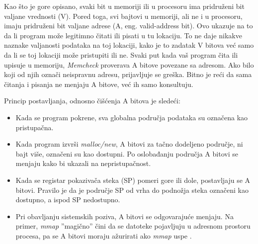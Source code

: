 \documentclass[12pt,oneside]{memoir}
\theoremstyle{plain}
\theoremstyle{definition}
\begin{document}
Kao što je gore opisano, svaki bit u memoriji ili u procesoru ima pridruženi bit valjane vrednosti (V). Pored toga, svi bajtovi u memoriji, ali ne i u procesoru, imaju pridruženi bit valjane adrese (A, eng. valid-address bit). Ovo ukazuje na to da li program može legitimno čitati ili pisati u tu lokaciju. To ne daje nikakve naznake valjanosti podataka na toj lokaciji, kako je to zadatak V bitova već samo da li se toj lokaciji može pristupiti ili ne. Svaki put kada vaš program čita ili upisuje u memoriju, \textit{Memcheck} proverava A bitove povezane sa adresom. Ako bilo koji od njih označi neispravnu adresu, prijavljuje se greška. Bitno je reći da sama čitanja i pisanja ne menjaju A bitove, već ih samo konsultuju.

Princip postavljanja, odnosno čišćenja A bitova je sledeći:
\begin{itemize}
\item Kada se program pokrene, sva globalna područja podataka su označena kao pristupačna.
\item Kada program izvrši \textit{malloc/new}, A bitovi za tačno dodeljeno područje, ni bajt više, označeni su kao dostupni. Po oslobađanju područja A bitovi se menjaju kako bi ukazali na nepristupačnost.
\item Kada se registar pokazivača steka (SP) pomeri gore ili dole, postavljaju se A bitovi. Pravilo je da je područje SP od vrha do podnožja steka označeni kao dostupno, a ispod SP nedostupno. 
\item Pri obavljanju sistemskih poziva, A bitovi se odgovarajuće menjaju. Na primer, \textit{mmap} ''magično'' čini da se datoteke pojavljuju u adresnom prostoru procesa, pa se A bitovi moraju ažurirati ako \textit{mmap} uspe \cite{Memcheck}. 
\end{itemize}
\end{document}
